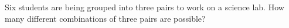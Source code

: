 Six students are being grouped into three pairs to work on a science lab. How many different combinations of three pairs are possible?
